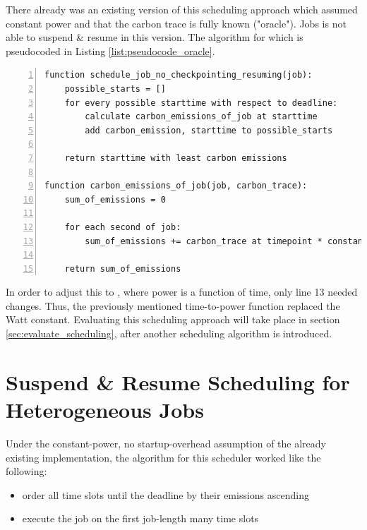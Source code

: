 There already was an existing version of this scheduling approach which assumed constant power and that the carbon trace is fully known ("oracle"). 
Jobs is not able to suspend \& resume in this version.
The algorithm for which is pseudocoded in Listing \ref{list:pseudocode_oracle}.

\begin{minipage}{\linewidth}
\begin{lstlisting}[frame=single, numbers=left, caption={Pseudocode for the original non-interrupt oracle scheduler}, label={list:pseudocode_oracle}, basicstyle=\ttfamily]
function schedule_job_no_checkpointing_resuming(job):
    possible_starts = []
    for every possible starttime with respect to deadline:
        calculate carbon_emissions_of_job at starttime
        add carbon_emission, starttime to possible_starts
    
    return starttime with least carbon emissions

function carbon_emissions_of_job(job, carbon_trace):
    sum_of_emissions = 0

    for each second of job:
        sum_of_emissions += carbon_trace at timepoint * constant_watt
    
    return sum_of_emissions
\end{lstlisting}
\end{minipage}

In order to adjust this to \modelname, where power is a function of time, only line 13 needed changes. 
Thus, the previously mentioned time-to-power function replaced the Watt constant.
Evaluating this scheduling approach will take place in section \ref{sec:evaluate_scheduling}, after another scheduling algorithm is introduced.

\section{{Suspend \& Resume Scheduling for Heterogeneous Jobs}} \label{sec:checkpoint_resume_lp}

Under the constant-power, no startup-overhead assumption of the already existing implementation, the algorithm for this scheduler worked like the following:

\begin{itemize}
    \item order all time slots until the deadline by their emissions ascending
    \item execute the job on the first job-length many time slots
\end{itemize}

